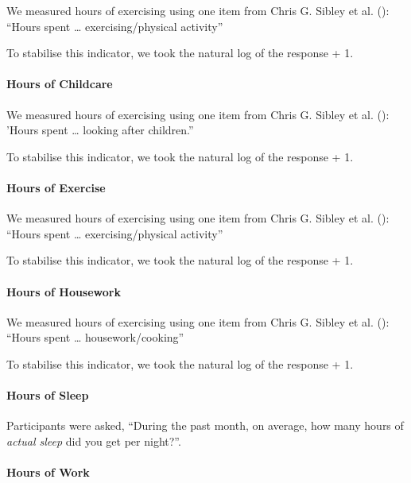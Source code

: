 \documentclass[
  single column]{article}
\let\oldparagraph\paragraph
\renewcommand{\paragraph}[1]{\oldparagraph{#1}\mbox{}}
\begin{document}
We measured hours of exercising using one item from Chris G. Sibley et
al. (): ``Hours spent \ldots{}
exercising/physical activity''

To stabilise this indicator, we took the natural log of the response +
1.

\paragraph{Hours of Childcare}\label{hours-of-childcare-1}

We measured hours of exercising using one item from Chris G. Sibley et
al. (): 'Hours spent \ldots{} looking
after children.''

To stabilise this indicator, we took the natural log of the response +
1.

\paragraph{Hours of Exercise}\label{hours-of-exercise-1}

We measured hours of exercising using one item from Chris G. Sibley et
al. (): ``Hours spent \ldots{}
exercising/physical activity''

To stabilise this indicator, we took the natural log of the response +
1.

\paragraph{Hours of Housework}\label{hours-of-housework-1}

We measured hours of exercising using one item from Chris G. Sibley et
al. (): ``Hours spent \ldots{}
housework/cooking''

To stabilise this indicator, we took the natural log of the response +
1.

\paragraph{Hours of Sleep}\label{hours-of-sleep}

Participants were asked, ``During the past month, on average, how many
hours of \emph{actual sleep} did you get per night?''.

\paragraph{Hours of Work}\label{hours-of-work}
\end{document}
